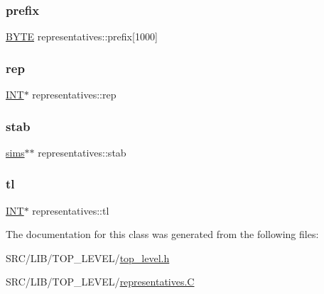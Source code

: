 \subsubsection{\texorpdfstring{prefix}{prefix}}
{\footnotesize\ttfamily \mbox{\hyperlink{galois_8h_ab6cc7b4aeb6ea31aba2b3fbfc83ff5e6}{B\+Y\+TE}} representatives\+::prefix\mbox{[}1000\mbox{]}}

\mbox{\label{classrepresentatives_a54606fec73e1e752da9a0b232129436e}} 
\subsubsection{\texorpdfstring{rep}{rep}}
{\footnotesize\ttfamily \mbox{\hyperlink{galois_8h_a09fddde158a3a20bd2dcadb609de11dc}{I\+NT}}$\ast$ representatives\+::rep}

\mbox{\label{classrepresentatives_a1a4987be45c045b41b9cbfb7c8a3f067}} 
\subsubsection{\texorpdfstring{stab}{stab}}
{\footnotesize\ttfamily \mbox{\hyperlink{classsims}{sims}}$\ast$$\ast$ representatives\+::stab}

\mbox{\label{classrepresentatives_a2e5a34807e1b69ead55daabafa2554e1}} 
\subsubsection{\texorpdfstring{tl}{tl}}
{\footnotesize\ttfamily \mbox{\hyperlink{galois_8h_a09fddde158a3a20bd2dcadb609de11dc}{I\+NT}}$\ast$ representatives\+::tl}



The documentation for this class was generated from the following files\+:\begin{DoxyCompactItemize}
\item 
S\+R\+C/\+L\+I\+B/\+T\+O\+P\+\_\+\+L\+E\+V\+E\+L/\mbox{\hyperlink{top__level_8h}{top\+\_\+level.\+h}}\item 
S\+R\+C/\+L\+I\+B/\+T\+O\+P\+\_\+\+L\+E\+V\+E\+L/\mbox{\hyperlink{representatives_8_c}{representatives.\+C}}\end{DoxyCompactItemize}
